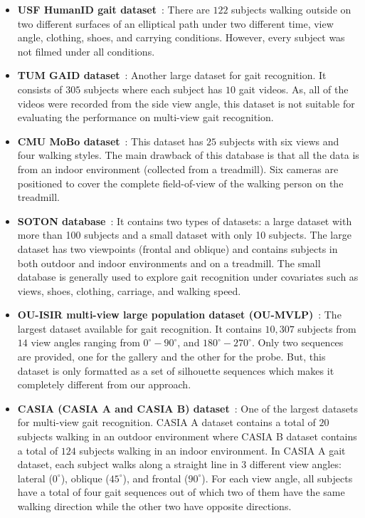 \begin{itemize}
	\item \textbf{USF HumanID gait dataset}~\cite{Sarkar_05}: There are $122$ subjects walking outside on two different surfaces of an elliptical path under two different time, view angle, clothing, shoes, and carrying conditions. However, every subject was not filmed under all conditions.
	
	\item \textbf{TUM GAID dataset}~\cite{Hofmann_14}: Another large dataset for gait recognition. It consists of $ 305 $ subjects where each subject has $ 10 $ gait videos. As, all of the videos were recorded from the side view angle, this dataset is not suitable for evaluating the performance on multi-view gait recognition.
	
	\item \textbf{CMU MoBo dataset}~\cite{Gross_01}: This dataset has $25$ subjects with six views and four walking styles. The main drawback of this database is that all the data is from an indoor environment (collected from a treadmill). Six cameras are positioned to cover the complete field-of-view of the walking person on the treadmill.
	
	\item \textbf{SOTON database}~\cite{Shutler_04}: It contains two types of datasets: a large dataset with more than 100 subjects and a small dataset with only 10 subjects. The large dataset has two viewpoints (frontal and oblique) and contains subjects in both outdoor and indoor environments and on a treadmill. The small database is generally used to explore gait recognition under covariates such as views, shoes, clothing, carriage, and walking speed.
	
	\item \textbf{OU-ISIR multi-view large population dataset (OU-MVLP)}~\cite{Noriko_18}: The largest dataset available for gait recognition. It contains $ 10,307 $ subjects from $ 14 $ view angles ranging from ${{0}^{\circ}-{90}^{\circ}}$, and ${{180}^{\circ}-{270}^{\circ}}$. Only two sequences are provided, one for the gallery and the other for the probe. But, this dataset is only formatted as a set of silhouette sequences which makes it completely different from our approach.
	
	\item \textbf{CASIA (CASIA A and CASIA B) dataset}~\cite{Yu_06}: One of the largest datasets for multi-view gait recognition. CASIA A dataset contains a total of $ 20 $ subjects walking in an outdoor environment where CASIA B dataset contains a total of $ 124 $ subjects walking in an indoor environment. In CASIA A gait dataset, each subject walks along a straight line in 3 different view angles: lateral (${0^{\circ}}$), oblique (${45^{\circ}}$), and frontal (${90^{\circ}}$). For each view angle, all subjects have a total of four gait sequences out of which two of them have the same walking direction while the other two have opposite directions. 
	

\end{itemize}
